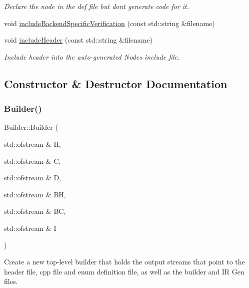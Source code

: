 \begin{DoxyCompactItemize}
\begin{DoxyCompactList}\small\item\em Declare the node in the def file but don\textquotesingle{}t generate code for it. \end{DoxyCompactList}\item 
void \hyperlink{class_builder_ab3a71329b155fa1c5f1a032cc0a99ada}{include\+Backend\+Specific\+Verification} (const std\+::string \&filename)
\item 
\mbox{\label{class_builder_ada675cf949abede7bead34d8dba2c5c4}} 
void \hyperlink{class_builder_ada675cf949abede7bead34d8dba2c5c4}{include\+Header} (const std\+::string \&filename)
\begin{DoxyCompactList}\small\item\em Include header into the auto-\/generated Nodes include file. \end{DoxyCompactList}\end{DoxyCompactItemize}


\subsection{Constructor \& Destructor Documentation}
\mbox{\label{class_builder_ad8b47f32295c7b773fa6d504bb347c70}} 
\subsubsection{\texorpdfstring{Builder()}{Builder()}\hspace{0.1cm}{\footnotesize\ttfamily [1/2]}}
{\footnotesize\ttfamily Builder\+::\+Builder (\begin{DoxyParamCaption}\item[{std\+::ofstream \&}]{H,  }\item[{std\+::ofstream \&}]{C,  }\item[{std\+::ofstream \&}]{D,  }\item[{std\+::ofstream \&}]{BH,  }\item[{std\+::ofstream \&}]{BC,  }\item[{std\+::ofstream \&}]{I }\end{DoxyParamCaption})\hspace{0.3cm}{\ttfamily [inline]}}

Create a new top-\/level builder that holds the output streams that point to the header file, cpp file and enum definition file, as well as the builder and IR Gen files. \mbox{\label{class_builder_a1a3f96e2daf78e66733ecd941d0eb5ec}} 
